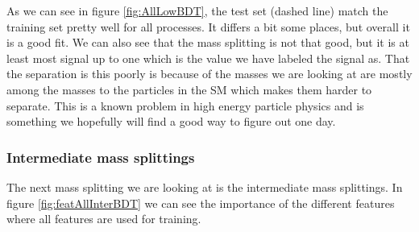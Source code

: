 As we can see in figure \ref{fig:AllLowBDT}, the test set (dashed line) match the training set pretty well for all processes. It differs a bit some places, but overall it is a good fit. We can also see that the mass splitting is not that good, but it is at least most signal up to one which is the value we have labeled the signal as. That the separation is this poorly is because of the masses we are looking at are mostly among the masses to the particles in the SM which makes them harder to separate. This is a known problem in high energy particle physics and is something we hopefully will find a good way to figure out one day. 



























\subsubsection{Intermediate mass splittings}

The next mass splitting we are looking at is the intermediate mass splittings. In figure \ref{fig:featAllInterBDT} we can see the importance of the different features where all features are used for training. 

